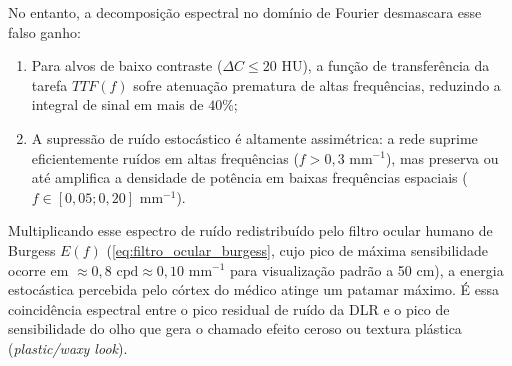 \documentclass[
  12pt,
  a4paper,
  oneside
]{report}
\begin{document}
No entanto, a decomposição espectral no domínio de Fourier desmascara esse falso ganho:
\begin{enumerate}
  \item Para alvos de baixo contraste ($\Delta C \le 20\text{ HU}$), a função de transferência da tarefa $TTF(f)$ sofre atenuação prematura de altas frequências, reduzindo a integral de sinal em mais de $40\%$;
  \item A supressão de ruído estocástico é altamente assimétrica: a rede suprime eficientemente ruídos em altas frequências ($f > 0{,}3\text{ mm}^{-1}$), mas preserva ou até amplifica a densidade de potência em baixas frequências espaciais ($f \in [0{,}05; 0{,}20]\text{ mm}^{-1}$).
\end{enumerate}

Multiplicando esse espectro de ruído redistribuído pelo filtro ocular humano de Burgess $E(f)$ (\cref{eq:filtro_ocular_burgess}, cujo pico de máxima sensibilidade ocorre em $\approx 0{,}8\text{ cpd} \approx 0{,}10\text{ mm}^{-1}$ para visualização padrão a 50 cm), a energia estocástica percebida pelo córtex do médico atinge um patamar máximo. É essa coincidência espectral entre o pico residual de ruído da DLR e o pico de sensibilidade do olho que gera o chamado efeito ceroso ou textura plástica (\emph{plastic/waxy look}).
\end{document}
